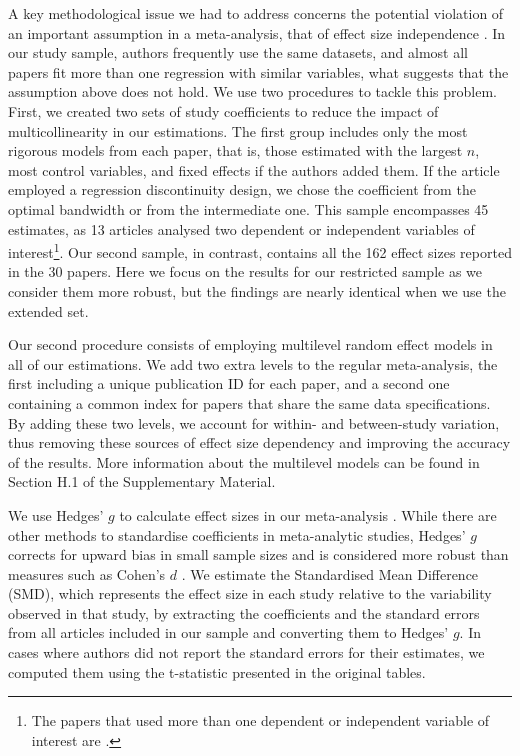 \documentclass[11pt,a4paper,]{article}
\begin{document}
A key methodological issue we had to address concerns the potential
violation of an important assumption in a meta-analysis, that of effect
size independence
\citep{cheung2014modeling, cheung2019guide, veroniki2016methods}. In our
study sample, authors frequently use the same datasets, and almost all
papers fit more than one regression with similar variables, what
suggests that the assumption above does not hold. We use two procedures
to tackle this problem. First, we created two sets of study coefficients
to reduce the impact of multicollinearity in our estimations. The first
group includes only the most rigorous models from each paper, that is,
those estimated with the largest \(n\), most control variables, and
fixed effects if the authors added them. If the article employed a
regression discontinuity design, we chose the coefficient from the
optimal bandwidth or from the intermediate one. This sample encompasses
45 estimates, as 13 articles analysed two dependent or independent
variables of interest\footnote{The papers that used more than one
dependent or independent variable of interest are \citet{bjedov2014impact,
bradbury2001legislative, chen2007law, crowley2019law, erler2007termlimits,
gilligan2001fiscal, lee2015supermajority, lee2016supermajority, lee2018court,
maldonado2013legislatures, primo2006stop, ricciuti2003trading,
ricciuti2004legislatures}.}. Our second sample, in contrast, contains
all the 162 effect sizes reported in the 30 papers. Here we focus on the
results for our restricted sample as we consider them more robust, but
the findings are nearly identical when we use the extended set.

Our second procedure consists of employing multilevel random effect
models \citep{cheung2014modeling, matthes2019meta} in all of our
estimations. We add two extra levels to the regular meta-analysis, the
first including a unique publication ID for each paper, and a second one
containing a common index for papers that share the same data
specifications. By adding these two levels, we account for within- and
between-study variation, thus removing these sources of effect size
dependency and improving the accuracy of the results. More information
about the multilevel models can be found in Section H.1 of the
Supplementary Material.

We use Hedges' \(g\) to calculate effect sizes in our meta-analysis
\citep{hedges1981distribution}. While there are other methods to
standardise coefficients in meta-analytic studies, Hedges' \(g\)
corrects for upward bias in small sample sizes and is considered more
robust than measures such as Cohen's \(d\)
\citep{lakens2013calculating}. We estimate the Standardised Mean
Difference (SMD), which represents the effect size in each study
relative to the variability observed in that study, by extracting the
coefficients and the standard errors from all articles included in our
sample and converting them to Hedges' \(g\). In cases where authors did
not report the standard errors for their estimates, we computed them
using the t-statistic presented in the original tables.
\end{document}
